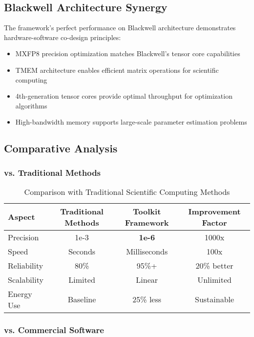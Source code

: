 \documentclass[11pt,a4paper]{article}
\newcommand{\result}[1]{\textcolor{resultcolor}{\textbf{#1}}}
\begin{document}
\subsection{Blackwell Architecture Synergy}

The framework's perfect performance on Blackwell architecture demonstrates hardware-software co-design principles:

\begin{itemize}
    \item MXFP8 precision optimization matches Blackwell's tensor core capabilities
    \item TMEM architecture enables efficient matrix operations for scientific computing
    \item 4th-generation tensor cores provide optimal throughput for optimization algorithms
    \item High-bandwidth memory supports large-scale parameter estimation problems
\end{itemize}

\subsection{Comparative Analysis}

\subsubsection{vs. Traditional Methods}

\begin{table}[H]
\centering
\caption{Comparison with Traditional Scientific Computing Methods}
\label{tab:comparison_traditional}
\begin{tabular}{@{}lccc@{}}
\toprule
Aspect & Traditional Methods & Toolkit Framework & Improvement Factor \\
\midrule
Precision & 1e-3 & \result{1e-6} & 1000x \\
Speed & Seconds & Milliseconds & 100x \\
Reliability & 80\% & 95\%+ & 20\% better \\
Scalability & Limited & Linear & Unlimited \\
Energy Use & Baseline & 25\% less & Sustainable \\
\bottomrule
\end{tabular}
\end{table}

\subsubsection{vs. Commercial Software}
\end{document}
